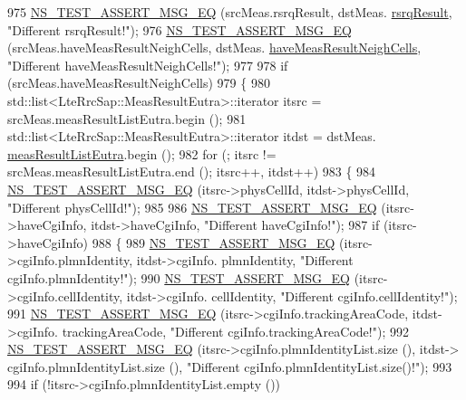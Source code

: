 \begin{DoxyCode}
975   \hyperlink{group__testing_ga2a9d78cffb3db8e867c35fff0b698cf5}{NS\_TEST\_ASSERT\_MSG\_EQ} (srcMeas.rsrqResult, dstMeas.
      \hyperlink{structns3_1_1LteRrcSap_1_1MeasResults_a6a64246cfa5d09eb42120890de3dca32}{rsrqResult}, \textcolor{stringliteral}{"Different rsrqResult!"});
976   \hyperlink{group__testing_ga2a9d78cffb3db8e867c35fff0b698cf5}{NS\_TEST\_ASSERT\_MSG\_EQ} (srcMeas.haveMeasResultNeighCells, dstMeas.
      \hyperlink{structns3_1_1LteRrcSap_1_1MeasResults_a1a102ebfb647fe85739933dcd2532736}{haveMeasResultNeighCells}, \textcolor{stringliteral}{"Different haveMeasResultNeighCells!"});
977 
978   \textcolor{keywordflow}{if} (srcMeas.haveMeasResultNeighCells)
979     \{
980       std::list<LteRrcSap::MeasResultEutra>::iterator itsrc = srcMeas.measResultListEutra.begin ();
981       std::list<LteRrcSap::MeasResultEutra>::iterator itdst = dstMeas.
      \hyperlink{structns3_1_1LteRrcSap_1_1MeasResults_a1fc2cdef154508dd522b46c71f854f03}{measResultListEutra}.begin ();
982       \textcolor{keywordflow}{for} (; itsrc != srcMeas.measResultListEutra.end (); itsrc++, itdst++)
983         \{
984           \hyperlink{group__testing_ga2a9d78cffb3db8e867c35fff0b698cf5}{NS\_TEST\_ASSERT\_MSG\_EQ} (itsrc->physCellId, itdst->physCellId, \textcolor{stringliteral}{"Different
       physCellId!"});
985 
986           \hyperlink{group__testing_ga2a9d78cffb3db8e867c35fff0b698cf5}{NS\_TEST\_ASSERT\_MSG\_EQ} (itsrc->haveCgiInfo, itdst->haveCgiInfo, \textcolor{stringliteral}{"Different
       haveCgiInfo!"});
987           \textcolor{keywordflow}{if} (itsrc->haveCgiInfo)
988             \{
989               \hyperlink{group__testing_ga2a9d78cffb3db8e867c35fff0b698cf5}{NS\_TEST\_ASSERT\_MSG\_EQ} (itsrc->cgiInfo.plmnIdentity, itdst->cgiInfo.
      plmnIdentity, \textcolor{stringliteral}{"Different cgiInfo.plmnIdentity!"});
990               \hyperlink{group__testing_ga2a9d78cffb3db8e867c35fff0b698cf5}{NS\_TEST\_ASSERT\_MSG\_EQ} (itsrc->cgiInfo.cellIdentity, itdst->cgiInfo.
      cellIdentity, \textcolor{stringliteral}{"Different cgiInfo.cellIdentity!"});
991               \hyperlink{group__testing_ga2a9d78cffb3db8e867c35fff0b698cf5}{NS\_TEST\_ASSERT\_MSG\_EQ} (itsrc->cgiInfo.trackingAreaCode, itdst->cgiInfo.
      trackingAreaCode, \textcolor{stringliteral}{"Different cgiInfo.trackingAreaCode!"});
992               \hyperlink{group__testing_ga2a9d78cffb3db8e867c35fff0b698cf5}{NS\_TEST\_ASSERT\_MSG\_EQ} (itsrc->cgiInfo.plmnIdentityList.size (), itdst->
      cgiInfo.plmnIdentityList.size (), \textcolor{stringliteral}{"Different cgiInfo.plmnIdentityList.size()!"});
993 
994               \textcolor{keywordflow}{if} (!itsrc->cgiInfo.plmnIdentityList.empty ())

\end{DoxyCode}
